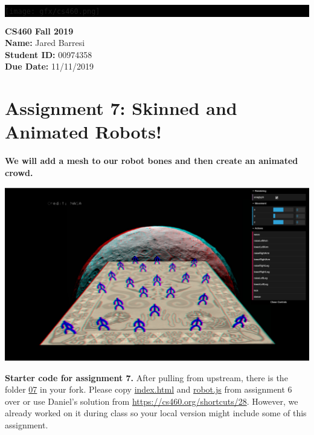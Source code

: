 \documentclass[10pt,oneside,onecolumn,letterpaper]{article}
\begin{document}
\noindent\colorbox{black}{
\begin{minipage}[c]{.99\linewidth}
  \vspace{.4cm}
  \Large{}
  \begin{flushright}
    \vspace{-1.2cm}
    \texttt{[image: gfx/cs460.png]}
  \end{flushright}
\end{minipage}
}


\vspace{.5cm} %

\noindent\textbf{CS460 Fall 2019} \\
\textbf{Name:} Jared Barresi \\
\textbf{Student ID:} 00974358 \\
\textbf{Due Date:} 11/11/2019

\section*{Assignment 7: Skinned and Animated Robots!}

\textbf{We will add a mesh to our robot bones and then create an animated crowd.}

\vspace{.5cm} %

\begin{center}
\includegraphics[width=.72\textwidth]{gfx/screenshot-1.png}
\end{center}

\vspace{.5cm}

\noindent\textbf{Starter code for assignment 7.} After pulling from upstream, there is the folder \url{07} in your fork. Please copy \url{index.html} and \url{robot.js} from assignment 6 over or use Daniel's solution from \url{https://cs460.org/shortcuts/28}.  However, we already worked on it during class so your local version might include some of this assignment.
\end{document}
